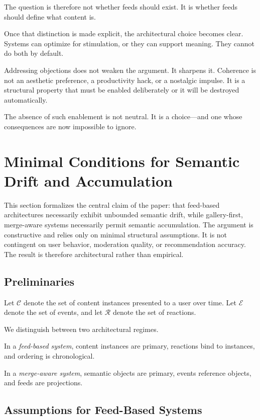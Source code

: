 \documentclass[11pt,oneside]{article}
\begin{document}
The question is therefore not whether feeds should exist. It is whether feeds should define what content is.

Once that distinction is made explicit, the architectural choice becomes clear. Systems can optimize for stimulation, or they can support meaning. They cannot do both by default.

Addressing objections does not weaken the argument. It sharpens it. Coherence is not an aesthetic preference, a productivity hack, or a nostalgic impulse. It is a structural property that must be enabled deliberately or it will be destroyed automatically.

The absence of such enablement is not neutral. It is a choice—and one whose consequences are now impossible to ignore.

\section{Minimal Conditions for Semantic Drift and Accumulation}

This section formalizes the central claim of the paper: that feed-based architectures necessarily exhibit unbounded semantic drift, while gallery-first, merge-aware systems necessarily permit semantic accumulation. The argument is constructive and relies only on minimal structural assumptions. It is not contingent on user behavior, moderation quality, or recommendation accuracy. The result is therefore architectural rather than empirical.

\subsection{Preliminaries}

Let $\mathcal{C}$ denote the set of content instances presented to a user over time. Let $\mathcal{E}$ denote the set of events, and let $\mathcal{R}$ denote the set of reactions.

We distinguish between two architectural regimes.

In a \emph{feed-based system}, content instances are primary, reactions bind to instances, and ordering is chronological.

In a \emph{merge-aware system}, semantic objects are primary, events reference objects, and feeds are projections.

\subsection{Assumptions for Feed-Based Systems}
\end{document}
